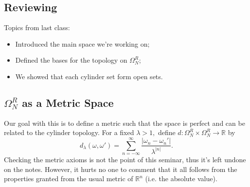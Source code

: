 \documentclass{article}
\begin{document}
\subsection{Reviewing}
  Topics from last class:
 \begin{itemize}
   \item Introduced the main space we're working on;
   \item Defined the bases for the topology on $\Omega_{N}^{R}$;
   \item We showed that each cylinder set form open sets.
 \end{itemize}
 \subsection{$\Omega_{N}^{R}$ as a Metric Space}
  Our goal with this is to define a metric such that the space is perfect and can be related to the cylinder topology.
For a fixed $\lambda > 1,$ define $d:\Omega_{N}^{R}\times{\Omega_{N}^{R}}\rightarrow \mathbb{R}$ by
  $$
    d_{\lambda}(\omega, \omega') = \sum\limits_{n=-\infty}^{\infty} \frac{|\omega_{n} - \omega_{n}'|}{\lambda^{|n|}}.
  $$
  Checking the metric axioms is not the point of this seminar, thus it's left undone on the notes. However, it hurts no one to 
comment that it all follows from the properties granted from the usual metric of $\mathbb{R}^{n}$ (i.e. the absolute value).
\end{document}
